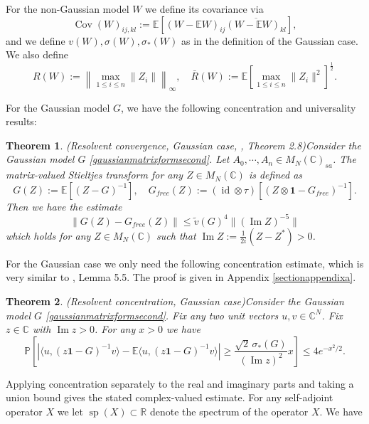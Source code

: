 \documentclass[11pt,reqno]{amsart}
\theoremstyle{plain}
\newtheorem{theorem}{Theorem}[section]
\theoremstyle{remark}
\numberwithin{equation}{section}
\begin{document}
For the non-Gaussian model $W$ we define its covariance via
\begin{equation}
    \operatorname{Cov}(W)_{ij,kl}:=\mathbb{E}[(W-\mathbb{E}W)_{ij}\overline{(W-\mathbb{E}W)_{kl}}],
\end{equation}
and we define $v(W),\sigma(W),\sigma_*(W)$ as in the definition of the Gaussian case. We also define 
\begin{equation} R(W):=\left\|\max_{1\leq i\leq n}\|Z_i\|\right\|_\infty,\quad 
    \bar{R}(W):=\mathbb{E}\left[\max_{1\leq i\leq n}\|Z_i\|^2\right]^\frac{1}{2}.
\end{equation}



For the Gaussian model $G$, we have the following concentration and universality results:


\begin{theorem}(Resolvent convergence, Gaussian case, \cite{bandeira2023matrix}, Theorem 2.8)\label{resolventconvergencegauss} Consider the Gaussian model $G$ \eqref{gaussianmatrixformsecond}.
Let $A_0,\cdots,A_n\in M_N(\mathbb{C})_{sa}$. The matrix-valued Stieltjes transform for any $Z\in M_N(\mathbb{C})$ is defined as
$$
G(Z):=\mathbb{E}[(Z-G)^{-1}],\quad G_{free}(Z):=(\operatorname{id}\otimes\tau)[(Z\otimes\mathbf{1}-G_{free})^{-1}].
$$
    Then we have the estimate
    $$
\|G(Z)-G_{free}(Z)\|\leq\tilde{v}(G)^4\|(\operatorname{Im}Z)^{-5}\| 
    $$ which holds for any $Z\in M_N(\mathbb{C})$ such that $\operatorname{Im}Z:=\frac{1}{2i}(Z-Z^*)>0$.
\end{theorem}


For the Gaussian case we only need the following concentration estimate, which is very similar to \cite{brailovskaya2022universality}, Lemma 5.5. The proof is given in Appendix \ref{sectionappendixa}.
\begin{theorem}(Resolvent concentration, Gaussian case)\label{resolventconcentrationgauss} Consider the Gaussian model $G$ \eqref{gaussianmatrixformsecond}. Fix any two unit vectors $u,v\in\mathbb{C}^N$. Fix $z\in\mathbb{C}$ with $\operatorname{Im}z>0$. For any $x>0$ we have
    $$
\mathbb{P}\left[\left| \langle u,
(z\mathbf{1}-G)^{-1}v\rangle-\mathbb{E}\langle u,(z\mathbf{1}-G)^{-1}v\rangle\right|\geq\frac{\sqrt{2}\,\sigma_*(G)}{(\operatorname{Im}z)^2}
x\right]\leq 4e^{-x^2/2}.
    $$
\end{theorem}
Applying concentration separately to the real and imaginary parts and taking a union bound gives the stated complex-valued estimate.
For any self-adjoint operator $X$ we let $\operatorname{sp}(X)\subset\mathbb{R}$ denote the spectrum of the operator $X$. We have
\end{document}
